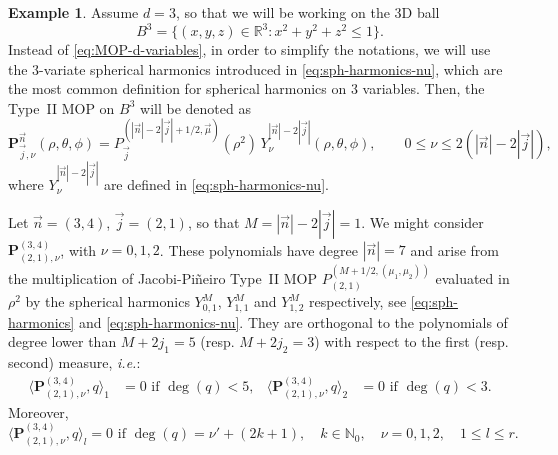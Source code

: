 \documentclass[a4paper]{article}
\theoremstyle{plain}
\theoremstyle{definition}
\newtheorem{example}[theorem]{Example}
\newcommand{\RR}{\mathbb{R}}
\begin{document}
    
    \begin{example} 
        Assume $d=3$, so that we will be working on the 3D ball $$B^3=\{(x,y,z)\in\RR^3:x^2+y^2+z^2\leq 1\}.$$
        Instead of \eqref{eq:MOP-d-variables}, in order to simplify the notations, we will use the $3$-variate spherical harmonics introduced in \eqref{eq:sph-harmonics-nu}, which are the most common definition for spherical harmonics on 3 variables. Then, the Type~II MOP on $B^3$ will be denoted as
        \begin{equation}
        \label{eq:mop-ball}
        \mathbf{P}_{\vec j,\nu}^{\vec n}(\rho,\theta,\phi) = P_{\vec j}^{(|\vec n|-2|\vec j|+1/2,\vec \mu)}(\rho^2)\, Y_{\nu}^{|\vec n|-2|\vec j|}(\rho,\theta,\phi),\qquad 0\leq \nu\leq 2(|\vec n|-2|\vec j|),
        \end{equation}
        where $Y_\nu^{|\vec n|-2|\vec j|}$ are defined in \eqref{eq:sph-harmonics-nu}.
        
    
        Let $\vec n = (3,4)$, $\vec j=(2,1)$, so that $M=|\vec n|-2|\vec j| = 1$. We might consider $\mathbf P^{(3,4)}_{(2,1),\nu}$, with $\nu=0, 1, 2$. These polynomials have degree $|\vec n|=7$ and arise from the multiplication of Jacobi-Pi\~neiro Type~II MOP $P^{(M+1/2,(\mu_1,\mu_2))}_{(2,1)}$ evaluated in $\rho^2$ by the spherical harmonics $Y^M_{0,1}$, $Y^M_{1,1}$ and $Y^M_{1,2}$  respectively, see \eqref{eq:sph-harmonics} and \eqref{eq:sph-harmonics-nu}. They are orthogonal to the polynomials of degree lower than $M+2j_1=5$ (resp. $M+2j_2 = 3$) with respect to the first (resp. second) measure, \emph{i.e.}:
        \begin{align*}
             \langle \mathbf P^{(3,4)}_{(2,1),\nu},q\rangle_1 &=0 \text{ if }\deg(q)<5, & 
            \langle \mathbf P^{(3,4)}_{(2,1),\nu},q\rangle_2 &=0 \text{ if }\deg(q)<3.  
        \end{align*} 
        Moreover, 
        $$
        \langle \mathbf P^{(3,4)}_{(2,1),\nu},q\rangle_l =0 \text{ if }\deg(q)=\nu'+(2k+1), \quad k\in\mathbb N_0, \quad \nu=0,1,2, \quad 1\leq l\leq r.
        $$
        

\end{example}
\end{document}
